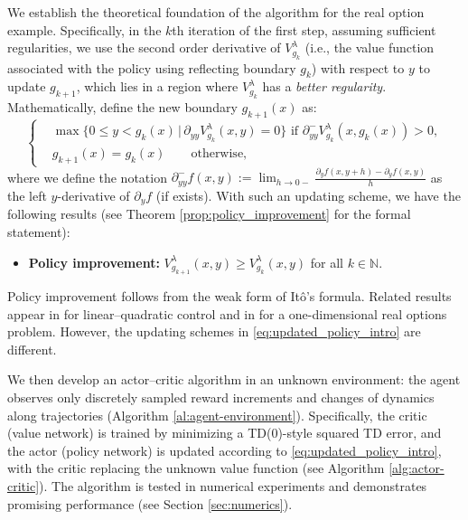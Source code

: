 \documentclass[11pt]{amsart}
\theoremstyle{plain}
\numberwithin{equation}{section}
\begin{document}
We establish the theoretical foundation of the algorithm for the real option example. Specifically, in the $k$th iteration of the first step, assuming sufficient regularities, we use the second order derivative of $V^\lambda_{g_k}$ (i.e., the value function associated with the policy using reflecting boundary $g_k$) with respect to $y$ to update $g_{k+1}$, which lies in a region where $V^\lambda_{g_k}$ has a {\it better regularity}.  Mathematically, define the new boundary ${g}_{k+1}(x)$ as:
  \begin{equation}\label{eq:updated_policy_intro}
      \begin{cases}
       & \max \Big\{0\leq y < g_{k}(x)\,\Big|\, \partial_{yy} V^\lambda_{g_{k}}(x,y) =0     \Big\} \,\,\text{if} \,\, \partial_{yy}^- V^\lambda_{g_{k}}(x,g_{k}(x))>0, \\
    &  {g}_{k+1}(x) = g_{k} (x)  \qquad \text{otherwise},  
      \end{cases}
  \end{equation}
  where we define the notation $\partial_{yy}^- f(x,y):= \lim_{h\rightarrow0-}\frac{\partial_y f(x,y+h)-\partial_y f(x,y)}{h}$ as the left $y$-derivative of $\partial_y f$ (if exists). With such an updating scheme, we have the following results (see Theorem \ref{prop:policy_improvement} for the formal statement):
\begin{itemize}
    \item \textbf{Policy improvement:} $V^\lambda_{g_{k+1}}(x,y)\ge V^\lambda_{g_k}(x,y)$ for all $k\in \mathbb{N}$.
\end{itemize}
Policy improvement follows from the weak form of It\^o's formula. Related results appear in \cite{wang2020reinforcement} for linear--quadratic control and in \cite{dianetti2026reinforcement} for a one-dimensional real options problem. However, the updating schemes in \eqref{eq:updated_policy_intro} are different.

We then develop an actor–critic algorithm in an unknown environment: the agent observes only discretely sampled reward increments and changes of dynamics  along trajectories (Algorithm \ref{al:agent-environment}). Specifically, the critic (value network) is trained by minimizing a TD(0)-style squared TD error, and the actor (policy network) is updated according to \eqref{eq:updated_policy_intro}, with the critic replacing the unknown value function (see Algorithm \ref{alg:actor-critic}). The algorithm is tested in numerical experiments and demonstrates promising performance (see Section \ref{sec:numerics}).
\end{document}
